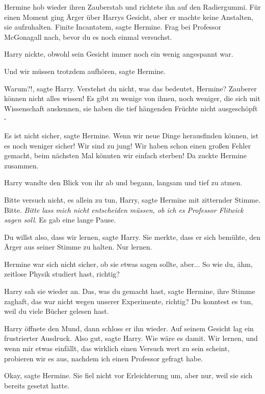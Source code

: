 Hermine hob wieder ihren Zauberstab und richtete ihn auf den Radiergummi. Für
einen Moment ging Ärger über Harrys Gesicht, aber er machte keine Anstalten, sie
aufzuhalten. \glqq Finite Incantatem\grqq{}, sagte Hermine. \glqq Frag bei
Professor McGonagall nach, bevor du es noch einmal versuchst.\grqq{}

Harry nickte, obwohl sein Gesicht immer noch ein wenig angespannt war.

\glqq Und wir müssen trotzdem aufhören\grqq{}, sagte Hermine.

\glqq Warum?!\grqq{}, sagte Harry. \glqq Verstehst du nicht, was das bedeutet,
Hermine? Zauberer können nicht alles wissen! Es gibt zu wenige von ihnen, noch
weniger, die sich mit Wissenschaft auskennen, sie haben die tief hängenden
Früchte nicht ausgeschöpft -\grqq{}

\glqq Es ist nicht sicher\grqq{}, sagte Hermine. \glqq Wenn wir neue Dinge
herausfinden können, ist es noch weniger sicher! Wir sind zu jung! Wir haben
schon einen großen Fehler gemacht, beim nächsten Mal könnten wir einfach
sterben!\grqq{} Da zuckte Hermine zusammen.

Harry wandte den Blick von ihr ab und begann, langsam und tief zu atmen.

\glqq Bitte versuch nicht, es allein zu tun, Harry\grqq{}, sagte Hermine mit
zitternder Stimme. \glqq Bitte.\grqq{} \emph{Bitte lass mich nicht entscheiden
müssen, ob ich es Professor Flitwick sagen soll}. Es gab eine lange Pause.

\glqq Du willst also, dass wir lernen\grqq{}, sagte Harry. Sie merkte, dass er
sich bemühte, den Ärger aus seiner Stimme zu halten. \glqq Nur lernen.\grqq{}

Hermine war sich nicht sicher, ob sie etwas sagen sollte, aber... \glqq So wie
du, ähm, zeitlose Physik studiert hast, richtig?\grqq{}

Harry sah sie wieder an. \glqq Das, was du gemacht hast\grqq{}, sagte Hermine,
ihre Stimme zaghaft, \glqq das war nicht wegen unserer Experimente, richtig? Du
konntest es tun, weil du viele Bücher gelesen hast.\grqq{}

Harry öffnete den Mund, dann schloss er ihn wieder. Auf seinem Gesicht lag ein
frustrierter Ausdruck. \glqq Also gut\grqq{}, sagte Harry. \glqq Wie wäre es
damit. Wir lernen, und wenn mir etwas einfällt, das wirklich einen Versuch wert
zu sein scheint, probieren wir es aus, nachdem ich einen Professor gefragt
habe.\grqq{}

\glqq Okay\grqq{}, sagte Hermine. Sie fiel nicht vor Erleichterung um, aber nur,
weil sie sich bereits gesetzt hatte.

